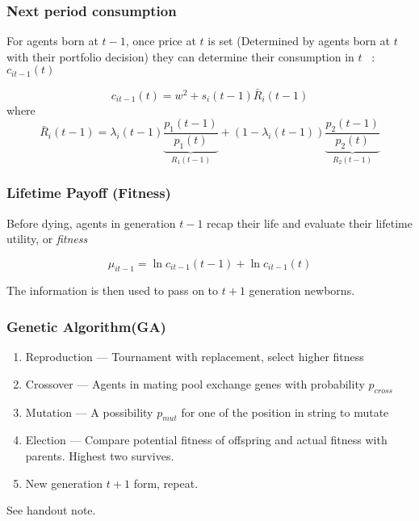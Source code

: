 \begin{frame}
    \frametitle{Next period consumption}

    For agents born at $t-1$, once price at $t$ is set 
    (Determined by agents born at $t$ with their portfolio decision)
    they can determine their consumption in $t$ ~: $c_{it-1}(t)$

    \begin{equation*}
        c_{it-1}(t) = w^2 + s_i(t-1)\bar{R}_i(t-1)
    \end{equation*}
    where
    \begin{equation*}
        \bar{R}_i(t-1) = \lambda_i(t-1) 
        \underbrace{\frac{p_1(t-1)}{p_1(t)}}_{R_1(t-1)} + 
        (1-\lambda_i(t-1)) 
        \underbrace{\frac{p_2(t-1)}{p_2(t)}}_{R_2(t-1)}
    \end{equation*}

\end{frame}

\begin{frame}
    \frametitle{Lifetime Payoff (Fitness)}

    Before dying, agents in  generation $t-1$ recap their life and evaluate their lifetime utility, or \emph{fitness} 

    \begin{equation*}
        \mu_{it-1} = \ln c_{it-1}(t-1) + \ln c_{it-1}(t) 
    \end{equation*}

    \vfill
    
    The information is then used to pass on to $t+1$ generation newborns. 
\end{frame}

\begin{frame}
    \frametitle{Genetic Algorithm(GA)}
    \begin{enumerate}
        \item Reproduction --- Tournament with replacement, select higher fitness
        \item Crossover --- Agents in mating pool exchange genes with probability $p_{cross}$
        \item Mutation --- A possibility $p_{mut}$ for one of the position in string to mutate
        \item Election --- Compare potential fitness of offspring and actual fitness with parents. Highest two survives. 
        \item New generation $t+1$ form, repeat. 
    \end{enumerate}

    \vfill 

    See handout note.
\end{frame}

